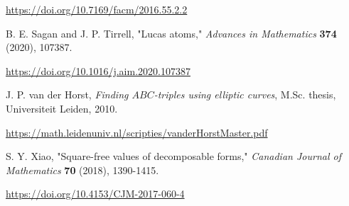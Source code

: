 \documentclass[11pt]{article}
\begin{document}
\url{https://doi.org/10.7169/facm/2016.55.2.2}

B. E. Sagan and J. P. Tirrell, "Lucas atoms," \emph{Advances in Mathematics}
\textbf{374} (2020), 107387.

\url{https://doi.org/10.1016/j.aim.2020.107387}

J. P. van der Horst, \emph{Finding \(ABC\)-triples using elliptic curves},
M.Sc. thesis, Universiteit Leiden, 2010.

\url{https://math.leidenuniv.nl/scripties/vanderHorstMaster.pdf}

S. Y. Xiao, "Square-free values of decomposable forms," \emph{Canadian Journal
of Mathematics} \textbf{70} (2018), 1390-1415.

\url{https://doi.org/10.4153/CJM-2017-060-4}
\end{document}
